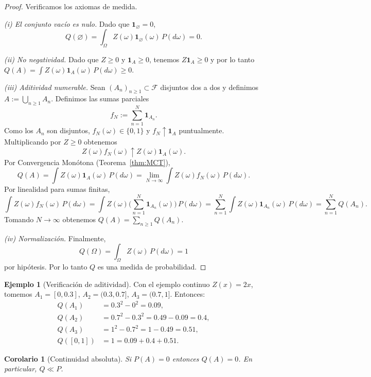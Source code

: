 \documentclass[11pt,a4paper]{article}
\theoremstyle{plain}
\newtheorem{corollary}[theorem]{Corolario}
\theoremstyle{definition}
\newtheorem{example}[theorem]{Ejemplo}
\theoremstyle{remark}
\newcommand{\1}{\mathbf{1}}
\newcommand{\cF}{\mathcal{F}}
\begin{document}
\begin{proof}
Verificamos los axiomas de medida.

\smallskip
\noindent\emph{(i) El conjunto vacío es nulo.} Dado que $\1_{\varnothing}=0$,
\[
Q(\varnothing)=\int_\Omega Z(\omega)\1_{\varnothing}(\omega)\,P(d\omega)=0.
\]

\smallskip
\noindent\emph{(ii) No negatividad.} Dado que $Z\ge0$ y $\1_A\ge0$, tenemos $Z\1_A\ge0$ y por lo tanto $Q(A)=\int Z(\omega)\1_A(\omega)\,P(d\omega)\ge0$.

\smallskip
\noindent\emph{(iii) Aditividad numerable.} Sean $(A_n)_{n\ge1}\subset\cF$ disjuntos dos a dos y definimos $A:=\bigcup_{n\ge1}A_n$.
Definimos las sumas parciales
\[
f_N := \sum_{n=1}^N \1_{A_n}.
\]
Como los $A_n$ son disjuntos, $f_N(\omega)\in\{0,1\}$ y $f_N\uparrow \1_A$ puntualmente. Multiplicando por $Z\ge0$ obtenemos
\[
Z(\omega) f_N(\omega) \uparrow Z(\omega)\1_A(\omega).
\]
Por Convergencia Monótona (Teorema~\ref{thm:MCT}),
\[
Q(A)=\int Z(\omega)\1_A(\omega)\,P(d\omega)
=\lim_{N\to\infty}\int Z(\omega) f_N(\omega)\,P(d\omega).
\]
Por linealidad para sumas finitas,
\[
\int Z(\omega) f_N(\omega)\,P(d\omega)
=\int Z(\omega)\Big(\sum_{n=1}^N \1_{A_n}(\omega)\Big)\,P(d\omega)
=\sum_{n=1}^N \int Z(\omega)\1_{A_n}(\omega)\,P(d\omega)
=\sum_{n=1}^N Q(A_n).
\]
Tomando $N\to\infty$ obtenemos $Q(A)=\sum_{n\ge1}Q(A_n)$.

\smallskip
\noindent\emph{(iv) Normalización.} Finalmente,
\[
Q(\Omega)=\int_\Omega Z(\omega)\,P(d\omega) = 1
\]
por hipótesis. Por lo tanto $Q$ es una medida de probabilidad.
\end{proof}

\begin{example}[Verificación de aditividad]
Con el ejemplo continuo $Z(x)=2x$, tomemos $A_1=[0,0.3]$, $A_2=(0.3,0.7]$, $A_3=(0.7,1]$. Entonces:
\begin{align*}
Q(A_1) &= 0.3^2 - 0^2 = 0.09,\\
Q(A_2) &= 0.7^2 - 0.3^2 = 0.49 - 0.09 = 0.4,\\
Q(A_3) &= 1^2 - 0.7^2 = 1 - 0.49 = 0.51,\\
Q([0,1]) &= 1 = 0.09+0.4+0.51.
\end{align*}
\end{example}

\begin{corollary}[Continuidad absoluta]
\label{cor:QllP}
Si $P(A)=0$ entonces $Q(A)=0$. En particular, $Q\ll P$.
\end{corollary}
\end{document}
